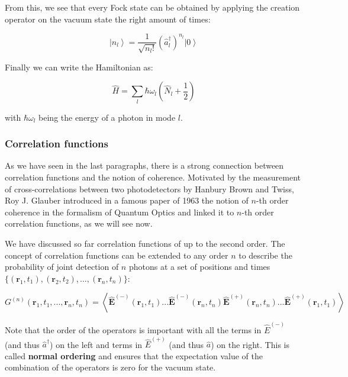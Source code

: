 \noindent From this, we see that every Fock state can be obtained by applying the creation operator on the vacuum state the right amount of times:

\begin{equation}
    \left|n_{l}\right\rangle=\frac{1}{\sqrt{n_{l} !}}\left(\hat{a}_{l}^{\dagger}\right)^{n_{l}}\left|0\right\rangle
\end{equation}


\noindent Finally we can write the Hamiltonian as:

\begin{equation}
    \hat{H}=\sum_{l} \hbar \omega_{l}\left(\hat{N}_{l}+\frac{1}{2}\right)
\end{equation}

\noindent with $\hbar \omega_l$ being the energy of a photon in mode $l$.

\subsubsection{Correlation functions}

As we have seen in the last paragraphs, there is a strong connection between correlation functions and the notion of coherence. Motivated by the measurement of cross-correlations between two photodetectors by Hanbury Brown and Twiss, Roy J. Glauber introduced in a famous paper of 1963 \cite{glauber1963quantum} the notion of $n$-th order coherence in the formalism of Quantum Optics and linked it to $n$-th order correlation functions, as we will see now.

We have discussed so far correlation functions of up to the second order. The concept of correlation functions can be extended to any order $n$ to describe the probability of joint detection of $n$ photons at a set of positions and times $\{(\bm{r}_1,t_1),(\bm{r}_2,t_2),...,(\bm{r}_n,t_n)\}$: 

\begin{equation}
    G^{(n)}\left(\bm{r}_{1}, t_{1}, ... , \bm{r}_{n}, t_{n}\right)=\left\langle \hat{\bm{E}}^{(-)}\left(\bm{r}_{1}, t_{1}\right) ... \hat{\bm{E}}^{(-)}\left(\bm{r}_{n}, t_{n}\right) \hat{\bm{E}}^{(+)}\left(\bm{r}_{n}, t_{n}\right) ... \hat{\bm{E}}^{(+)}\left(\bm{r}_{1}, t_{1}\right)\right\rangle
\end{equation}

\label{sec:normal_order}
\noindent Note that the order of the operators is important with all the terms in $\hat{E}^{(-)}$ (and thus $\hat{a}^{\dagger}$) on the left and terms in $\hat{E}^{(+)}$ (and thus $\hat{a}$) on the right. This is called \textbf{normal ordering} and ensures that the expectation value of the combination of the operators is zero for the vacuum state. 

